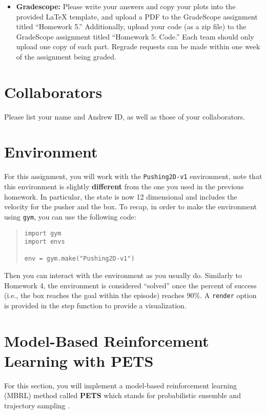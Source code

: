 \documentclass[12pt]{article}
\begin{document}
\begin{itemize}
\begin{itemize}
\item \textbf{Gradescope:} Please write your answers and copy your plots into the provided LaTeX template, and upload a PDF to the GradeScope assignment titled ``Homework 5.'' Additionally, upload your code (as a zip file) to the GradeScope assignment titled ``Homework 5: Code.'' Each team should only upload one copy of each part. Regrade requests can be made within one week of the assignment being graded.
\end{itemize}
\end{itemize}

\newpage

\section*{Collaborators}
Please list your name and Andrew ID, as well as those of your collaborators.

\section*{Environment}
For this assignment, you will work with the \texttt{Pushing2D-v1} environment, note that this environment is slightly \textbf{different} from the one you used in the previous homework.  In particular, the state is now 12 dimensional and includes the velocity for the pusher and the box.  To recap, in order to make the environment using \texttt{gym}, you can use the following code:
\begin{quote}
\begin{verbatim}
import gym
import envs

env = gym.make("Pushing2D-v1")
\end{verbatim}
\end{quote}
Then you can interact with the environment as you usually do.  Similarly to Homework 4, the environment is considered ``solved'' once the percent of success (i.e., the box reaches the goal within the episode) reaches $90\%$. A \texttt{render} option is provided in the step function to provide a visualization.

\section{Model-Based Reinforcement Learning with PETS}
For this section, you will implement a model-based reinforcement learning (MBRL) method called \textbf{PETS} which stands for probabilistic ensemble and trajectory sampling \cite{chua2018deep}. 
\end{document}

